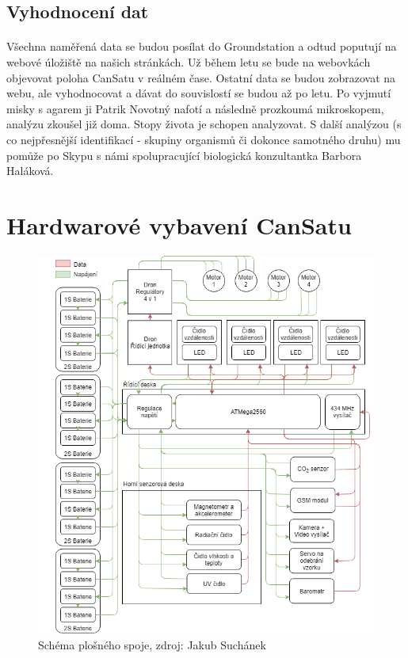 \documentclass[a4paper]{report}
\begin{document}
\subsection{Vyhodnocení dat}
\paragraph{} Všechna naměřená data se budou posílat do Groundstation a odtud poputují na webové úložiště na našich stránkách. Už během letu se bude na webovkách objevovat poloha CanSatu v reálném čase. Ostatní data se budou zobrazovat na webu, ale vyhodnocovat a dávat do souvislostí se budou až po letu. Po vyjmutí misky s agarem ji Patrik Novotný nafotí a následně prozkoumá mikroskopem, analýzu zkoušel již doma. Stopy života je schopen analyzovat. S další analýzou (s co nejpřesnější identifikací - skupiny organismů či dokonce samotného druhu) mu pomůže po Skypu s námi spolupracující biologická konzultantka Barbora Haláková.

\section{Hardwarové vybavení CanSatu}
\begin{figure}[H]
\caption{Schéma plošného spoje, zdroj: Jakub Suchánek}
\centering
\includegraphics[width=400pt]{CanSat_cz.png}
\end{figure}
\end{document}
